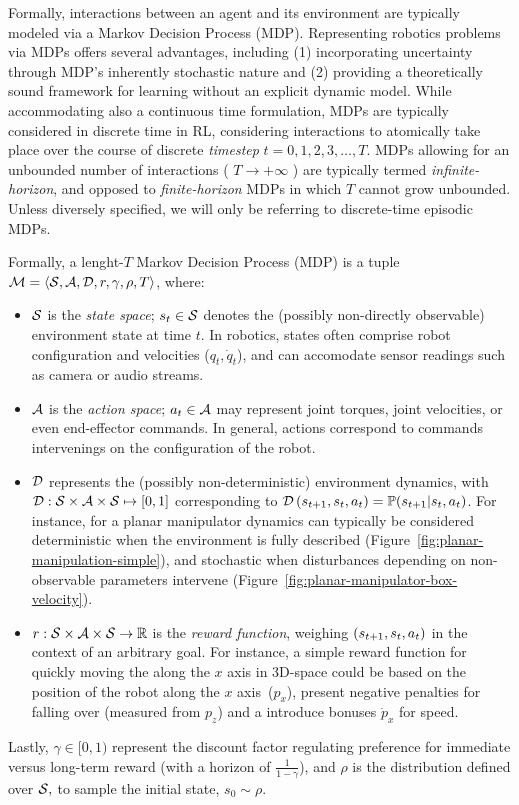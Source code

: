 Formally, interactions between an agent and its environment are typically modeled via a Markov Decision Process (MDP).
Representing robotics problems via MDPs offers several advantages, including (1) incorporating uncertainty through MDP's inherently stochastic nature and (2) providing a theoretically sound framework for learning without an explicit dynamic model.
While accommodating also a continuous time formulation, MDPs are typically considered in discrete time in RL, considering interactions to atomically take place over the course of discrete \emph{timestep} \( t=0,1,2,3, \dots, T \).
MDPs allowing for an unbounded number of interactions ( \( T \to + \infty \) ) are typically termed \emph{infinite-horizon}, and opposed to \emph{finite-horizon} MDPs in which \( T \) cannot grow unbounded.
Unless diversely specified, we will only be referring to discrete-time episodic MDPs.


Formally, a lenght-\(T\) Markov Decision Process (MDP) is a tuple \( \mathcal M = \langle \mathcal S, \mathcal A, \mathcal D, r, \gamma, \rho, T \rangle \), where:
\begin{itemize}
    \item \(\mathcal S\) is the \emph{state space}; \(s_t \in \mathcal S\) denotes the (possibly non-directly observable) environment state at time \(t\). In robotics, states often comprise robot configuration and velocities (\(q_t, \dot q_t\)), and can accomodate sensor readings such as camera or audio streams.
    \item \(\mathcal A\) is the \emph{action space}; \(a_t \in \mathcal A\) may represent joint torques, joint velocities, or even end-effector commands. In general, actions correspond to commands intervenings on the configuration of the robot. 
    \item \(\mathcal D\) represents the (possibly non-deterministic) environment dynamics, with \(\mathcal D: \mathcal S \times \mathcal A \times \mathcal S \mapsto [0, 1] \) corresponding to \( \mathcal D \, (s_{t+1}, s_t, a_t) = \mathbb P (s_{t+1} \vert s_t, a_t) \). For instance, for a planar manipulator dynamics can typically be considered deterministic when the environment is fully described (Figure~\ref{fig:planar-manipulation-simple}), and stochastic when disturbances depending on non-observable parameters intervene (Figure~\ref{fig:planar-manipulator-box-velocity}).
    \item \(r: \mathcal S \times \mathcal A \times \mathcal S \to \mathbb R\) is the \emph{reward function}, weighing \( (s_{t+1}, s_t, a_t) \) in the context of an arbitrary goal. For instance, a simple reward function for quickly moving the along the \( x \) axis in 3D-space could be based on the position of the robot along the \( x \) axis~(\(p_x\)), present negative penalties for falling over (measured from \( p_z \)) and a introduce bonuses \( \dot p_x \) for speed.
\end{itemize}
Lastly, \(\gamma \in [0,1)\) represent the discount factor regulating preference for immediate versus long-term reward (with a horizon of \( \tfrac{1}{1-\gamma} \)), and \( \rho \) is the distribution defined over \(\mathcal S, \) to sample the initial state, \( s_0 \sim \rho \).

